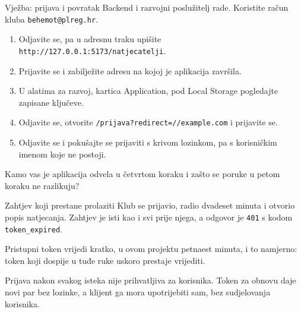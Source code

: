 \begin{frame}{Vježba: prijava i povratak}
Backend i razvojni poslužitelj rade. Koristite račun kluba \texttt{behemot@plreg.hr}.

\vspace{0.6em}
\begin{enumerate}
  \itemsep0.4em
  \item Odjavite se, pa u adresnu traku upišite \texttt{http://127.0.0.1:5173/natjecatelji}.
  \item Prijavite se i zabilježite adresu na kojoj je aplikacija završila.
  \item U alatima za razvoj, kartica Application, pod Local Storage pogledajte zapisane ključeve.
  \item Odjavite se, otvorite \texttt{/prijava?redirect=//example.com} i prijavite se.
  \item Odjavite se i pokušajte se prijaviti s krivom lozinkom, pa s korisničkim imenom koje ne postoji.
\end{enumerate}

\vspace{0.6em}
Kamo vas je aplikacija odvela u četvrtom koraku i zašto se poruke u petom koraku ne razlikuju?
\end{frame}


\begin{frame}{Zahtjev koji prestane prolaziti}
Klub se prijavio, radio dvadeset minuta i otvorio popis natjecanja. Zahtjev je isti kao i svi prije njega, a odgovor je \texttt{401} s kodom \texttt{token\_expired}.

\vspace{0.9em}
Pristupni token vrijedi kratko, u ovom projektu petnaest minuta, i to namjerno: token koji dospije u tuđe ruke uskoro prestaje vrijediti.

\vspace{0.9em}
Prijava nakon svakog isteka nije prihvatljiva za korisnika. Token za obnovu daje novi par bez lozinke, a klijent ga mora upotrijebiti sam, bez sudjelovanja korisnika.
\end{frame}

